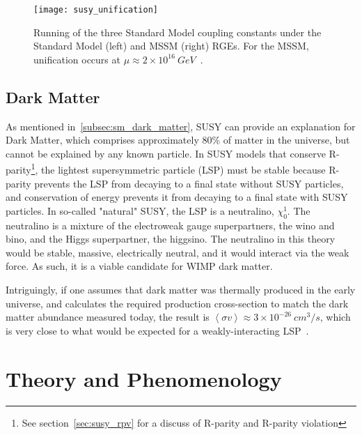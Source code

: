 \begin{figure}[!ht]
    \centering
\texttt{[image: susy\_unification]}
\caption{Running of the three Standard Model coupling constants under the Standard Model (left) and MSSM (right) RGEs.
For the MSSM, unification occurs at $\mu\approx 2\times 10^{16}~GeV$~\cite{susy-pheno-2000}.}
\label{fig:susy_unification}
\end{figure}

\subsection{Dark Matter}\label{subsec:susy_dark_matter}

As mentioned in~\ref{subsec:sm_dark_matter}, SUSY can provide an explanation for Dark Matter, which comprises approximately $80\%$ of matter in the universe, but cannot be explained by any known particle.
In SUSY models that conserve R-parity\footnote{See section~\ref{sec:susy_rpv} for a discuss of R-parity and R-parity violation}, the lightest supersymmetric particle (LSP) must be stable because R-parity prevents the LSP from decaying to a final state without SUSY particles, and conservation of energy prevents it from decaying to a final state with SUSY particles.
In so-called "natural" SUSY, the LSP is a neutralino, $\chi_0^{1}$.
The neutralino is a mixture of the electroweak gauge superpartners, the wino and bino, and the Higgs superpartner, the higgsino.
The neutralino in this theory would be stable, massive, electrically neutral, and it would interact via the weak force.
As such, it is a viable candidate for WIMP dark matter.

Intriguingly, if one assumes that dark matter was thermally produced in the early universe, and calculates the required production cross-section to match the dark matter abundance measured today, the result is $\left<\sigma v\right> \approx 3 \times 10^{-26}~cm^{3}/s$, which is very close to what would be expected for a weakly-interacting LSP~\cite{susy-dark-matter-1996}.

\section{Theory and Phenomenology}\label{sec:susy_theory}

